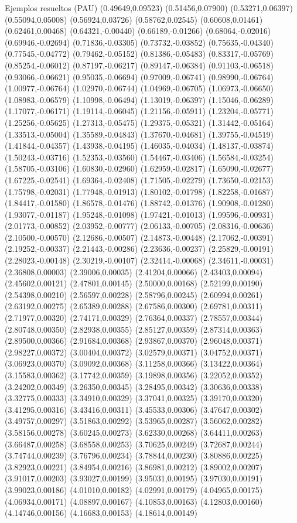 \documentclass[11pt,a4paper]{article}
\begin{document}
\begin{fmex}{Ejemplos resueltos (PAU)}
(0.49649,0.09523) (0.51456,0.07900) (0.53271,0.06397) (0.55094,0.05008) (0.56924,0.03726) (0.58762,0.02545) (0.60608,0.01461) (0.62461,0.00468) (0.64321,-0.00440) (0.66189,-0.01266) (0.68064,-0.02016) (0.69946,-0.02694) (0.71836,-0.03305) (0.73732,-0.03852) (0.75635,-0.04340) (0.77545,-0.04772) (0.79462,-0.05152) (0.81386,-0.05483) (0.83317,-0.05769) (0.85254,-0.06012) (0.87197,-0.06217) (0.89147,-0.06384) (0.91103,-0.06518) (0.93066,-0.06621) (0.95035,-0.06694) (0.97009,-0.06741) (0.98990,-0.06764) (1.00977,-0.06764) (1.02970,-0.06744) (1.04969,-0.06705) (1.06973,-0.06650) (1.08983,-0.06579) (1.10998,-0.06494) (1.13019,-0.06397) (1.15046,-0.06289) (1.17077,-0.06171) (1.19114,-0.06045) (1.21156,-0.05911) (1.23204,-0.05771) (1.25256,-0.05625) (1.27313,-0.05475) (1.29375,-0.05321) (1.31442,-0.05164) (1.33513,-0.05004) (1.35589,-0.04843) (1.37670,-0.04681) (1.39755,-0.04519) (1.41844,-0.04357) (1.43938,-0.04195) (1.46035,-0.04034) (1.48137,-0.03874) (1.50243,-0.03716) (1.52353,-0.03560) (1.54467,-0.03406) (1.56584,-0.03254) (1.58705,-0.03106) (1.60830,-0.02960) (1.62959,-0.02817) (1.65090,-0.02677) (1.67225,-0.02541) (1.69364,-0.02408) (1.71505,-0.02279) (1.73650,-0.02153) (1.75798,-0.02031) (1.77948,-0.01913) (1.80102,-0.01798) (1.82258,-0.01687) (1.84417,-0.01580) (1.86578,-0.01476) (1.88742,-0.01376) (1.90908,-0.01280) (1.93077,-0.01187) (1.95248,-0.01098) (1.97421,-0.01013) (1.99596,-0.00931) (2.01773,-0.00852) (2.03952,-0.00777) (2.06133,-0.00705) (2.08316,-0.00636) (2.10500,-0.00570) (2.12686,-0.00507) (2.14873,-0.00448) (2.17062,-0.00391) (2.19252,-0.00337) (2.21443,-0.00286) (2.23636,-0.00237) (2.25829,-0.00191) (2.28023,-0.00148) (2.30219,-0.00107) (2.32414,-0.00068) (2.34611,-0.00031) (2.36808,0.00003) (2.39006,0.00035) (2.41204,0.00066) (2.43403,0.00094) (2.45602,0.00121) (2.47801,0.00145) (2.50000,0.00168) (2.52199,0.00190) (2.54398,0.00210) (2.56597,0.00228) (2.58796,0.00245) (2.60994,0.00261) (2.63192,0.00275) (2.65389,0.00288) (2.67586,0.00300) (2.69781,0.00311) (2.71977,0.00320) (2.74171,0.00329) (2.76364,0.00337) (2.78557,0.00344) (2.80748,0.00350) (2.82938,0.00355) (2.85127,0.00359) (2.87314,0.00363) (2.89500,0.00366) (2.91684,0.00368) (2.93867,0.00370) (2.96048,0.00371) (2.98227,0.00372) (3.00404,0.00372) (3.02579,0.00371) (3.04752,0.00371) (3.06923,0.00370) (3.09092,0.00368) (3.11258,0.00366) (3.13422,0.00364) (3.15583,0.00362) (3.17742,0.00359) (3.19898,0.00356) (3.22052,0.00352) (3.24202,0.00349) (3.26350,0.00345) (3.28495,0.00342) (3.30636,0.00338) (3.32775,0.00333) (3.34910,0.00329) (3.37041,0.00325) (3.39170,0.00320) (3.41295,0.00316) (3.43416,0.00311) (3.45533,0.00306) (3.47647,0.00302) (3.49757,0.00297) (3.51863,0.00292) (3.53965,0.00287) (3.56062,0.00282) (3.58156,0.00278) (3.60245,0.00273) (3.62330,0.00268) (3.64411,0.00263) (3.66487,0.00258) (3.68558,0.00253) (3.70625,0.00249) (3.72687,0.00244) (3.74744,0.00239) (3.76796,0.00234) (3.78844,0.00230) (3.80886,0.00225) (3.82923,0.00221) (3.84954,0.00216) (3.86981,0.00212) (3.89002,0.00207) (3.91017,0.00203) (3.93027,0.00199) (3.95031,0.00195) (3.97030,0.00191) (3.99023,0.00186) (4.01010,0.00182) (4.02991,0.00179) (4.04965,0.00175) (4.06934,0.00171) (4.08897,0.00167) (4.10853,0.00163) (4.12803,0.00160) (4.14746,0.00156) (4.16683,0.00153) (4.18614,0.00149) 
\end{fmex}
\end{document}
